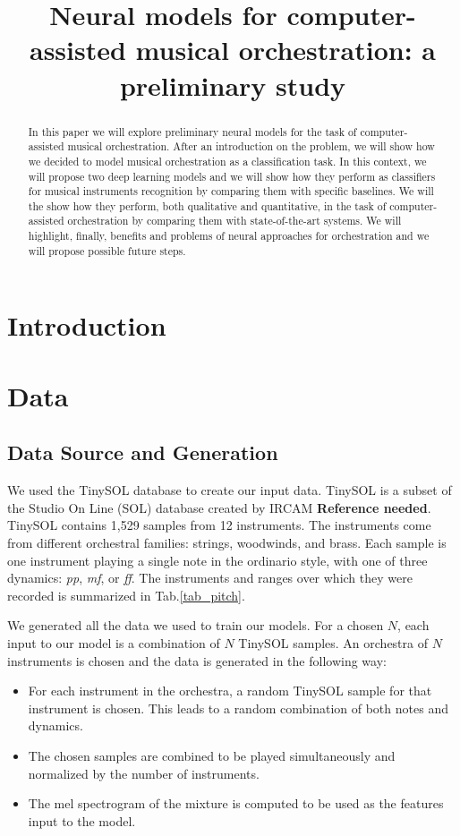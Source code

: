\documentclass{article}
\title{Neural models for computer-assisted musical orchestration: a preliminary study}
\begin{document}
%
\maketitle
%
\begin{abstract}
In this paper we will explore preliminary neural models for the task of computer-assisted musical orchestration. After an introduction on the problem, we will show how we decided to model musical orchestration as a classification task. In this context, we will propose two deep learning models and we will show how they perform as classifiers for musical instruments recognition by comparing them with specific baselines. We will the show how they perform, both qualitative and quantitative, in the task of computer-assisted orchestration by comparing them with state-of-the-art systems. We will highlight, finally, benefits and problems of neural approaches for orchestration and we will propose possible future steps.
\end{abstract}
%
\section{Introduction}\label{sec:introduction}

\section{Data}

\subsection{Data Source and Generation}
We used the TinySOL database to create our input data. TinySOL is a subset of the Studio On Line (SOL) database created by IRCAM \textbf{Reference needed}. TinySOL contains 1,529 samples from 12 instruments. The instruments come from different orchestral families: strings, woodwinds, and brass. Each sample is one instrument playing a single note in the ordinario style, with one of three dynamics: \textit{pp}, \textit{mf}, or \textit{ff}. The instruments and ranges over which they were recorded is summarized in Tab.\ref{tab_pitch}. 


We generated all the data we used to train our models. For a chosen $N$, each input to our model is a combination of $N$ TinySOL samples. An orchestra of $N$ instruments is chosen and the data is generated in the following way: 

\begin{itemize}
\item For each instrument in the orchestra, a random TinySOL sample for that instrument is chosen. This leads to a random combination of both notes and dynamics.
\item The chosen samples are combined to be played simultaneously and normalized by the number of instruments.
\item The mel spectrogram of the mixture is computed to be used as the features input to the model.
\end{itemize}
\end{document}

